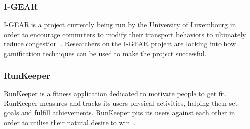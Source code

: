\documentclass[a4paper,12pt]{article}
\begin{document}
\subsubsection{I-GEAR}
I-GEAR is a project currently being run by the University of Luxembourg in order to encourage commuters to modify their transport behaviors to ultimately reduce congestion~\citep{igear,igear-2}. 
Researchers on the I-GEAR project are looking into how gamification techniques can be used to make the project successful.

\subsubsection{RunKeeper}
RunKeeper is a fitness application dedicated to motivate people to get fit. 
RunKeeper measures and tracks its users physical activities, helping them set goals and fulfill achievements. 
RunKeeper pits its users against each other in order to utilise their natural desire to win~\citep{desire-to-win}.
\end{document}
